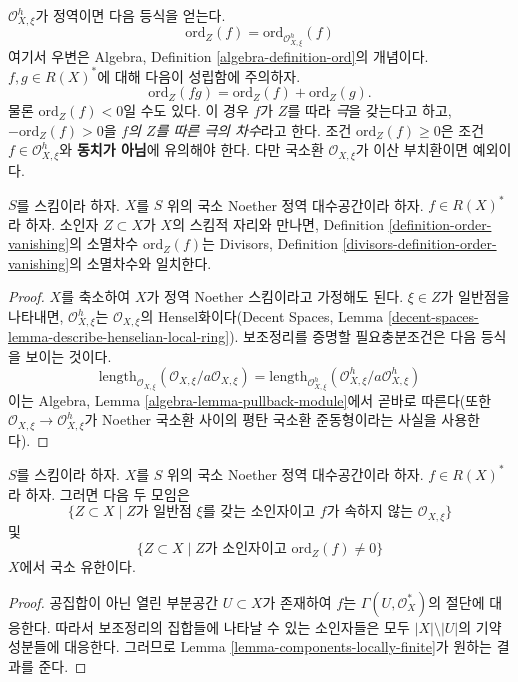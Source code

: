 \noindent
$\mathcal{O}_{X, \xi}^h$가 정역이면 다음 등식을 얻는다.
$$
\text{ord}_Z(f) = \text{ord}_{\mathcal{O}_{X, \xi}^h}(f)
$$
여기서 우변은 Algebra, Definition \ref{algebra-definition-ord}의
개념이다. $f, g \in R(X)^*$에 대해 다음이 성립함에 주의하자.
$$
\text{ord}_Z(fg) = \text{ord}_Z(f) + \text{ord}_Z(g).
$$
물론 $\text{ord}_Z(f) < 0$일 수도 있다. 이 경우 $f$가 $Z$를 따라
{\it 극}을 갖는다고 하고, $-\text{ord}_Z(f) > 0$을 {\it $f$의
$Z$를 따른 극의 차수}라고 한다. 조건 $\text{ord}_Z(f) \geq 0$은 조건
$f \in \mathcal{O}_{X, \xi}^h$와 {\bf 동치가 아님}에 유의해야 한다.
다만 국소환
$\mathcal{O}_{X, \xi}$가 이산 부치환이면 예외이다.

\begin{lemma}
\label{lemma-order-vanishing-agrees}
$S$를 스킴이라 하자. $X$를 $S$ 위의 국소 Noether 정역 대수공간이라
하자. $f \in R(X)^*$라 하자. 소인자 $Z \subset X$가 $X$의 스킴적
자리와 만나면, Definition \ref{definition-order-vanishing}의 소멸차수
$\text{ord}_Z(f)$는 Divisors, Definition
\ref{divisors-definition-order-vanishing}의 소멸차수와 일치한다.
\end{lemma}

\begin{proof}
$X$를 축소하여 $X$가 정역 Noether 스킴이라고 가정해도 된다.
$\xi \in Z$가 일반점을 나타내면, $\mathcal{O}_{X, \xi}^h$는
$\mathcal{O}_{X, \xi}$의 Hensel화이다(Decent Spaces, Lemma
\ref{decent-spaces-lemma-describe-henselian-local-ring}). 보조정리를
증명할 필요충분조건은 다음 등식을 보이는 것이다.
$$
\text{length}_{\mathcal{O}_{X, \xi}}
(\mathcal{O}_{X, \xi}/a \mathcal{O}_{X, \xi}) =
\text{length}_{\mathcal{O}_{X, \xi}^h}
(\mathcal{O}_{X, \xi}^h/a \mathcal{O}_{X, \xi}^h)
$$
이는 Algebra, Lemma \ref{algebra-lemma-pullback-module}에서 곧바로
따른다(또한 $\mathcal{O}_{X, \xi} \to \mathcal{O}_{X, \xi}^h$가
Noether 국소환 사이의 평탄 국소환 준동형이라는 사실을 사용한다).
\end{proof}

\begin{lemma}
\label{lemma-divisor-locally-finite}
$S$를 스킴이라 하자. $X$를 $S$ 위의 국소 Noether 정역 대수공간이라
하자. $f \in R(X)^*$라 하자. 그러면 다음 두 모임은
$$
\{Z \subset X \mid Z\text{가 일반점 }\xi\text{를 갖는 소인자이고 }
f\text{가 속하지 않는 }\mathcal{O}_{X, \xi}\}
$$
및
$$
\{Z \subset X \mid Z \text{가 소인자이고 }\text{ord}_Z(f) \not = 0\}
$$
$X$에서 국소 유한이다.
\end{lemma}

\begin{proof}
공집합이 아닌 열린 부분공간 $U \subset X$가 존재하여 $f$는
$\Gamma(U, \mathcal{O}_X^*)$의 절단에 대응한다. 따라서 보조정리의
집합들에 나타날 수 있는 소인자들은 모두 $|X| \setminus |U|$의
기약성분들에 대응한다. 그러므로 Lemma
\ref{lemma-components-locally-finite}가 원하는 결과를 준다.
\end{proof}

